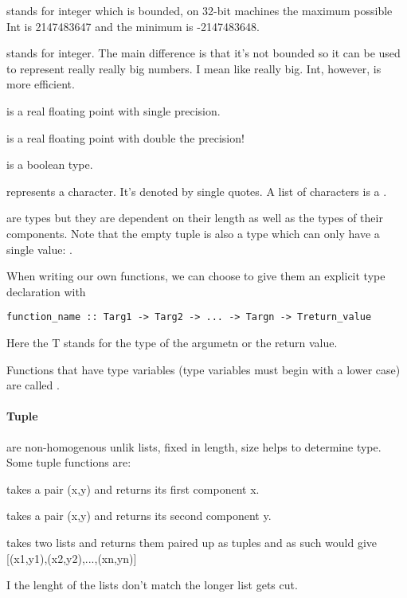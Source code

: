 \begin{compactitem}
\item {} stands for integer which is bounded, on 32-bit machines the maximum possible Int is 2147483647 and the minimum is -2147483648.
\item {} stands for integer. The main difference is that it's not bounded so it can be used to represent really really big numbers. I mean like really big. Int, however, is more efficient.
\item {} is a real floating point with single precision.
\item {} is a real floating point with double the precision!
\item {} is a boolean type. 
\item {} represents a character. It's denoted by single quotes. A list of characters is a .
\item {} are types but they are dependent on their length as well as the types of their components. Note that the empty tuple \e{()} is also a type which can only have a single value: \e{()}.
\item When writing our own functions, we can choose to give them an explicit type declaration with 
\begin{lstlisting}
function_name :: Targ1 -> Targ2 -> ... -> Targn -> Treturn_value
\end{lstlisting}
Here the T stands for the type of the argumetn or the return value.
\item Functions that have type variables (type variables must begin with a lower case) are called . 
\end{compactitem}

\paragraph{Tuple} 
 are non-homogenous unlik lists, fixed in length, size helps to determine type. Some tuple functions are:
\begin{compactitem}
\item {} takes a pair (x,y) and returns its first component x.
\item {} takes a pair (x,y) and returns its second component y.
\item {} takes two lists and returns them paired up as tuples and as such would give [(x1,y1),(x2,y2),...,(xn,yn)]
\end{compactitem}
I the lenght of the lists don't match the longer list gets cut.

